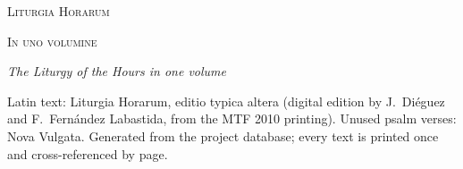 
\setpnumwidth{2.4em}\setrmarg{3.4em}   %
\setlength{\emergencystretch}{1.5em}   %

\frontmatter
\thispagestyle{empty}
\vspace*{1.6in}
{\centering
{\Huge\scshape\color{rubric}Liturgia Horarum\par}
\vspace{0.6em}
{\Large\scshape In uno volumine\par}
\vspace{1.4em}
{\large\itshape\foreignlanguage{english}{The Liturgy of the Hours in one volume}\par}
\ifdefined\variantnote{}\fi
\vfill
{\footnotesize\foreignlanguage{english}{Latin text: Liturgia Horarum, editio typica altera (digital edition by
J.~Diéguez and F.~Fernández Labastida, from the MTF 2010 printing). Unused psalm verses: Nova Vulgata.
Generated from the project database; every text is printed once and cross-referenced by page.}\par}
}
\clearpage
\foreignlanguage{english}{\tableofcontents*}
\mainmatter


